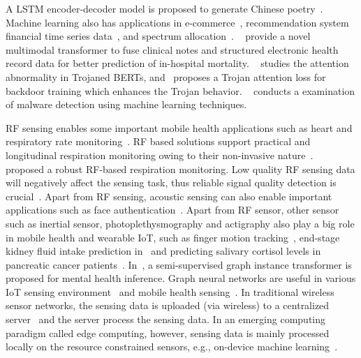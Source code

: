 A LSTM encoder-decoder model is proposed to generate Chinese poetry~\cite{yubo2017text}.
Machine learning also has applications in e-commerce~\cite{kexin2023ecommerce}, recommendation system~\cite{dong2020,dong2023,dong2023recommend}
financial time series data~\cite{kexin2023financial}, and spectrum allocation~\cite{mohammad2024}.
~\cite{lyu-clinical} provide a novel multimodal transformer to fuse clinical notes and structured electronic health record data
 for better prediction of in-hospital mortality.
~\cite{lyu-2022-trojaned} studies the attention abnormality in Trojaned BERTs,
and~\cite{lyu-2023-attentionenhancing} proposes a Trojan attention loss for backdoor training which enhances
the Trojan behavior.
~\cite{zhenglin} conducts a examination of malware detection using machine learning techniques.

RF sensing enables some important mobile health applications such as heart and respiratory rate monitoring~\cite{zongxing2022uwb,zongxing2022measure}. 
RF based solutions support practical and longitudinal respiration monitoring owing to their non-invasive nature~\cite{zongxing2023rf,zongxing2021uwb}.
~\cite{zongxing2024rfq} proposed a robust RF-based respiration monitoring.
Low quality RF sensing data will negatively affect the sensing task, thus reliable signal quality detection is crucial~\cite{zongxing2021quality}.
Apart from RF sensing, acoustic sensing can also enable important applications such as face authentication~\cite{zongxing2019face,zongxing2022face}.
Apart from RF sensor, other sensor such as inertial sensor, photoplethysmography and actigraphy also play a big role in mobile health and wearable IoT, 
such as finger motion tracking~\cite{yilin2021}, end-stage kidney fluid intake prediction in~\cite{guimin2022health} and predicting salivary cortisol levels in pancreatic cancer patients~\cite{guimin2021pancreatic}.
In~\cite{guimin2021health}, a semi-supervised graph instance transformer is proposed for mental health inference.
Graph neural networks are useful in various IoT sensing environment~\cite{guimin2023survey} and mobile health sensing~\cite{guimin_thesis}.
In traditional wireless sensor networks, the sensing data is uploaded (via wireless) to a centralized server~\cite{gupta2020,yubo2023blockchain} and the server process the sensing data.
In an emerging computing paradigm called edge computing, however, sensing data is mainly processed locally on the resource constrained sensors, 
e.g., on-device machine learning~\cite{yubo2020ondevice,yubo2022demo,yubo2019ondevice}.
